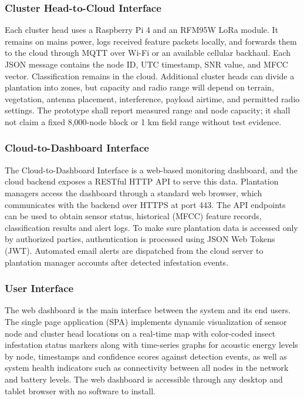 \documentclass[12pt,a4paper,oneside]{memoir}
\begin{document}
\subsubsection*{Cluster Head-to-Cloud Interface}
 
Each cluster head uses a Raspberry Pi 4 and an RFM95W LoRa module. It remains on mains power, logs received feature packets locally, and forwards them to the cloud through MQTT over Wi-Fi or an available cellular backhaul. Each JSON message contains the node ID, UTC timestamp, SNR value, and MFCC vector. Classification remains in the cloud. Additional cluster heads can divide a plantation into zones, but capacity and radio range will depend on terrain, vegetation, antenna placement, interference, payload airtime, and permitted radio settings. The prototype shall report measured range and node capacity; it shall not claim a fixed 8,000-node block or 1 km field range without test evidence.
 
\subsubsection*{Cloud-to-Dashboard Interface}
 
The Cloud-to-Dashboard Interface is a web-based monitoring dashboard, and the cloud backend exposes a RESTful HTTP API to serve this data. Plantation managers access the dashboard through a standard web browser, which communicates with the backend over HTTPS at port 443. The API endpoints can be used to obtain sensor status, historical (MFCC) feature records, classification results and alert logs. To make sure plantation data is accessed only by authorized parties, authentication is processed using JSON Web Tokens (JWT). Automated email alerts are dispatched from the cloud server to plantation manager accounts after detected infestation events.
 
\subsubsection*{User Interface}
 
The web dashboard is the main interface between the system and its end users. The single page application (SPA) implements dynamic visualization of sensor node and cluster head locations on a real-time map with color-coded insect infestation status markers along with time-series graphs for acoustic energy levels by node, timestamps and confidence scores against detection events, as well as system health indicators such as connectivity between all nodes in the network and battery levels. The web dashboard is accessible through any desktop and tablet browser with no software to install.
 
\end{document}
